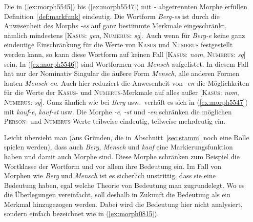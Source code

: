 \begin{exe}
  \ex \label{ex:morph5545}
  \begin{xlist}
  \end{xlist}
  \ex \label{ex:morph5546}
  \begin{xlist}
  \end{xlist}

  \Np
  
  \ex \label{ex:morph5547}
  \begin{xlist}
  \end{xlist}
\end{exe}

Die in (\ref{ex:morph5545}) bis (\ref{ex:morph5547}) mit \textit{-} abgetrennten Morphe erfüllen Definition~\ref{def:markfunk} eindeutig.
Die Wortform \textit{Berg-es} ist durch die Anwesenheit des Morphs \textit{-es} auf ganz bestimmte Merkmale eingeschränkt, nämlich mindestens [\textsc{Kasus}: \textit{gen}, \textsc{Numerus}: \textit{sg}].
\label{abs:4578239547}Auch wenn für \textit{Berg-e} keine ganz eindeutige Einschränkung für die Werte von \textsc{Kasus} und \textsc{Numerus} festgestellt werden kann, so kann diese Wortform \zB auf keinen Fall [\textsc{Kasus}: \textit{nom}, \textsc{Numerus}: \textit{sg}] sein.
In (\ref{ex:morph5546}) sind Wortformen von \textit{Mensch} aufgelistet.
In diesem Fall hat nur der Nominativ Singular die äußere Form \textit{Mensch}, alle anderen Formen lauten \textit{Mensch-en}.
Auch hier reduziert die Anwesenheit von \textit{-en} die Möglichkeiten für die Werte der \textsc{Kasus}- und \textsc{Numerus}-Merkmale auf alles außer [\textsc{Kasus}: \textit{nom}, \textsc{Numerus}: \textit{sg}].
Ganz ähnlich wie bei \textit{Berg} usw.\ verhält es sich in (\ref{ex:morph5547}) mit \textit{kauf-e}, \textit{kauf-st} usw.
Die Morphe \textit{-e}, \textit{-st} und \textit{-en} schränken die möglichen \textsc{Person}- und \textsc{Numerus}-Werte teilweise eindeutig, teilweise mehrdeutig ein.

Leicht übersieht man (aus Gründen, die in Abschnitt~\ref{sec:stamm} noch eine Rolle spielen werden), dass auch \textit{Berg}, \textit{Mensch} und \textit{kauf} eine Markierungsfunktion haben und damit auch Morphe sind.
Diese Morphe schränken zum Beispiel die Wortklasse der Wortform und vor allem ihre Bedeutung ein.
Im Fall von Morphen wie \textit{Berg} und \textit{Mensch} ist es sicherlich unstrittig, dass sie eine Bedeutung haben, egal welche Theorie von Bedeutung man zugrundelegt.
Wo es die Überlegungen vereinfacht, soll deshalb in Zukunft die Bedeutung als ein Merkmal hinzugezogen werden.
Dabei wird die Bedeutung hier nicht analysiert, sondern einfach bezeichnet wie in (\ref{ex:morph0815}).

